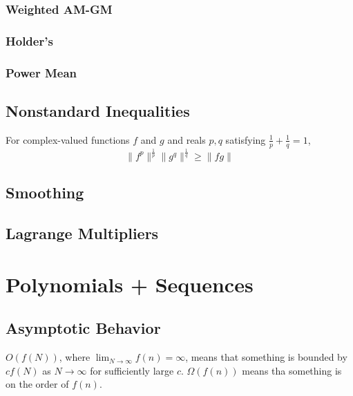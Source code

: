 \documentclass[11pt]{scrartcl}
\theoremstyle{plain} %
\theoremstyle{definition}
\theoremstyle{remark}
\newtheorem{remark}{Remark}
\theoremstyle{empty}
\theoremstyle{empty}
\theoremstyle{empty}
\theoremstyle{empty}
\theoremstyle{empty}
\theoremstyle{empty}
\theoremstyle{empty}
\begin{document}
\subsubsection{Weighted AM-GM}

\subsubsection{Holder's}

\subsubsection{Power Mean}

\subsection{Nonstandard Inequalities}

\begin{theorem}
  For complex-valued functions $f$ and $g$ and reals $p,q$ satisfying $\frac{1}{p} + \frac{1}{q} = 1$, \[\|f^p\|^{\frac{1}{p}} \|g^q\|^{\frac{1}{q}} \ge \|fg\|\]
\end{theorem}

\begin{example}
  
\end{example}



\subsection{Smoothing}

\subsection{Lagrange Multipliers}

\section{Polynomials + Sequences}

\subsection{Asymptotic Behavior}

\begin{definition}
  $O(f(N))$, where $\lim_{N \to \infty} f(n) = \infty$, means that something is bounded by $c f(N)$ as $N\to \infty$ for sufficiently large $c$. $\Omega(f(n))$ means tha something is on the order of $f(n)$. 
\end{definition}
\end{document}
